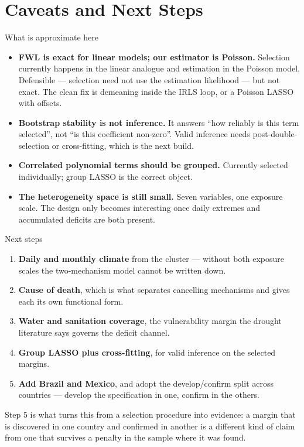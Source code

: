 \documentclass[10pt, aspectratio=169]{beamer}
\begin{document}
\section{Caveats and Next Steps}

\begin{frame}{What is approximate here}
  \begin{itemize}
    \item \textbf{FWL is exact for linear models; our estimator is Poisson.}
          Selection currently happens in the linear analogue and estimation in
          the Poisson model. Defensible --- selection need not use the
          estimation likelihood --- but not exact. The clean fix is
          demeaning inside the IRLS loop, or a Poisson LASSO with offsets.
    \item \textbf{Bootstrap stability is not inference.} It answers ``how
          reliably is this term selected'', not ``is this coefficient
          non-zero''. Valid inference needs post-double-selection or
          cross-fitting, which is the next build.
    \item \textbf{Correlated polynomial terms should be grouped.} Currently
          selected individually; group LASSO is the correct object.
    \item \textbf{The heterogeneity space is still small.} Seven variables,
          one exposure scale. The design only becomes interesting once daily
          extremes and accumulated deficits are both present.
  \end{itemize}
\end{frame}

\begin{frame}{Next steps}
  \begin{enumerate}
    \item \textbf{Daily and monthly climate} from the cluster --- without both
          exposure scales the two-mechanism model cannot be written down.
    \item \textbf{Cause of death}, which is what separates cancelling
          mechanisms and gives each its own functional form.
    \item \textbf{Water and sanitation coverage}, the vulnerability margin the
          drought literature says governs the deficit channel.
    \item \textbf{Group LASSO plus cross-fitting}, for valid inference on the
          selected margins.
    \item \textbf{Add Brazil and Mexico}, and adopt the develop/confirm split
          across countries --- develop the specification in one, confirm in
          the others.
  \end{enumerate}
  \vspace{0.4em}
  {\scriptsize Step 5 is what turns this from a selection procedure into
  evidence: a margin that is discovered in one country and confirmed in
  another is a different kind of claim from one that survives a penalty in
  the sample where it was found.}
\end{frame}
\end{document}
